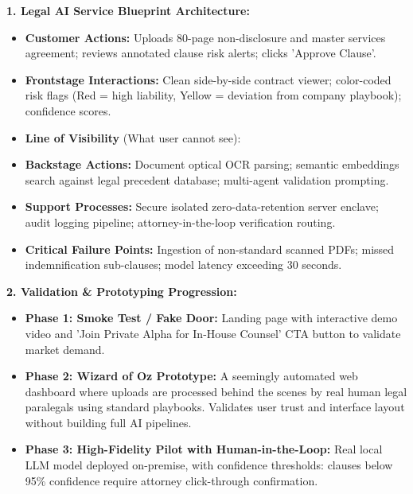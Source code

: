 \begin{solbox}
\textbf{1. Legal AI Service Blueprint Architecture:}\\
\begin{itemize}
    \item \textbf{Customer Actions:} Uploads 80-page non-disclosure and master services agreement; reviews annotated clause risk alerts; clicks 'Approve Clause'.
    \item \textbf{Frontstage Interactions:} Clean side-by-side contract viewer; color-coded risk flags (Red = high liability, Yellow = deviation from company playbook); confidence scores.
    \item \textbf{Line of Visibility} (What user cannot see):
    \item \textbf{Backstage Actions:} Document optical OCR parsing; semantic embeddings search against legal precedent database; multi-agent validation prompting.
    \item \textbf{Support Processes:} Secure isolated zero-data-retention server enclave; audit logging pipeline; attorney-in-the-loop verification routing.
    \item \textbf{Critical Failure Points:} Ingestion of non-standard scanned PDFs; missed indemnification sub-clauses; model latency exceeding 30 seconds.
\end{itemize}

\textbf{2. Validation \& Prototyping Progression:}\\
\begin{itemize}
    \item \textbf{Phase 1: Smoke Test / Fake Door:} Landing page with interactive demo video and 'Join Private Alpha for In-House Counsel' CTA button to validate market demand.
    \item \textbf{Phase 2: Wizard of Oz Prototype:} A seemingly automated web dashboard where uploads are processed behind the scenes by real human legal paralegals using standard playbooks. Validates user trust and interface layout without building full AI pipelines.
    \item \textbf{Phase 3: High-Fidelity Pilot with Human-in-the-Loop:} Real local LLM model deployed on-premise, with confidence thresholds: clauses below 95\% confidence require attorney click-through confirmation.
\end{itemize}


\end{solbox}
